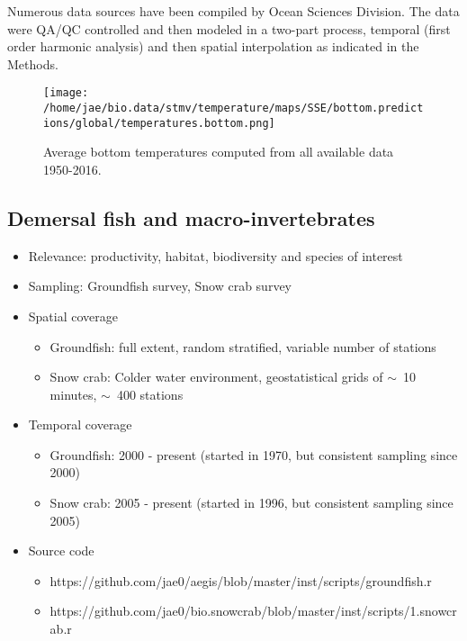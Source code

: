 \documentclass[letterpaper,portrait,11pt]{scrartcl}
\numberwithin{equation}{section}    %
\numberwithin{figure}{section}    %
\numberwithin{table}{section}       %
\begin{document}
Numerous data sources have been compiled by Ocean Sciences Division. The data were QA/QC controlled and then modeled in a two-part process, temporal (first order harmonic analysis) and then spatial interpolation as indicated in the Methods.


\begin{figure}[h]
  \centering
  \texttt{[image: /home/jae/bio.data/stmv/temperature/maps/SSE/bottom.predictions/global/temperatures.bottom.png]}
  \caption{Average bottom temperatures computed from all available data 1950-2016.}
  \label{fig:TemperatureBottomMap}
\end{figure}



\subsection{Demersal fish and macro-invertebrates}
\begin{itemize}
  \item Relevance:  productivity, habitat, biodiversity and species of interest
  \item Sampling:  Groundfish survey, Snow crab survey
  \item Spatial coverage
    \begin{itemize}
      \item Groundfish: full extent, random stratified, variable number of stations
      \item Snow crab: Colder water environment, geostatistical grids of $\sim$~10 minutes, $\sim$~400 stations
    \end{itemize}
  \item Temporal coverage
    \begin{itemize}
      \item Groundfish: 2000 - present (started in 1970, but consistent sampling since 2000)
      \item Snow crab: 2005 - present (started in 1996, but consistent sampling since 2005)
    \end{itemize}

  \item Source code
      \begin{itemize}
        \item https://github.com/jae0/aegis/blob/master/inst/scripts/groundfish.r
        \item https://github.com/jae0/bio.snowcrab/blob/master/inst/scripts/1.snowcrab.r
      \end{itemize}

\end{itemize}
\end{document}
